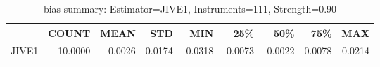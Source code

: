 \begin{table}[ht]
\centering
\caption{bias summary: Estimator=JIVE1, Instruments=111, Strength=0.90}
\begin{tabular}{lrrrrrrrr}
\toprule
 & COUNT & MEAN & STD & MIN & 25\% & 50\% & 75\% & MAX \\
\midrule
JIVE1 & 10.0000 & -0.0026 & 0.0174 & -0.0318 & -0.0073 & -0.0022 & 0.0078 & 0.0214 \\
\bottomrule
\end{tabular}
\end{table}
